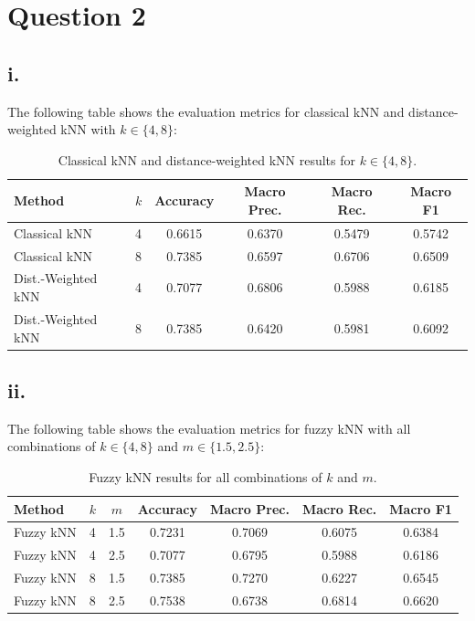 \documentclass[12pt,a4paper]{article}
\begin{document}
\section*{Question 2}

\subsection*{i.}

The following table shows the evaluation metrics for classical kNN and distance-weighted kNN with $k \in \{4, 8\}$:

\begin{table}[h]
\centering
\begin{tabular}{llcccc}
\toprule
\textbf{Method} & \textbf{$k$} & \textbf{Accuracy} & \textbf{Macro Prec.} & \textbf{Macro Rec.} & \textbf{Macro F1} \\
\midrule
Classical kNN & 4 & 0.6615 & 0.6370 & 0.5479 & 0.5742 \\
Classical kNN & 8 & 0.7385 & 0.6597 & 0.6706 & 0.6509 \\
\midrule
Dist.-Weighted kNN & 4 & 0.7077 & 0.6806 & 0.5988 & 0.6185 \\
Dist.-Weighted kNN & 8 & 0.7385 & 0.6420 & 0.5981 & 0.6092 \\
\bottomrule
\end{tabular}
\caption{Classical kNN and distance-weighted kNN results for $k \in \{4, 8\}$.}
\end{table}

\subsection*{ii.}

The following table shows the evaluation metrics for fuzzy kNN with all combinations of $k \in \{4, 8\}$ and $m \in \{1.5, 2.5\}$:

\begin{table}[h]
\centering
\begin{tabular}{lcccccc}
\toprule
\textbf{Method} & \textbf{$k$} & \textbf{$m$} & \textbf{Accuracy} & \textbf{Macro Prec.} & \textbf{Macro Rec.} & \textbf{Macro F1} \\
\midrule
Fuzzy kNN & 4 & 1.5 & 0.7231 & 0.7069 & 0.6075 & 0.6384 \\
Fuzzy kNN & 4 & 2.5 & 0.7077 & 0.6795 & 0.5988 & 0.6186 \\
Fuzzy kNN & 8 & 1.5 & 0.7385 & 0.7270 & 0.6227 & 0.6545 \\
Fuzzy kNN & 8 & 2.5 & 0.7538 & 0.6738 & 0.6814 & 0.6620 \\
\bottomrule
\end{tabular}
\caption{Fuzzy kNN results for all combinations of $k$ and $m$.}
\end{table}
\end{document}
